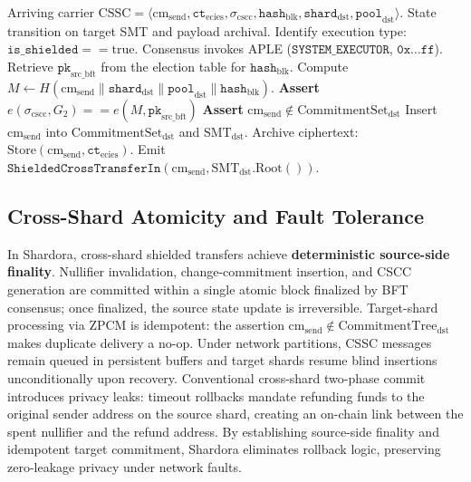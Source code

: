 \documentclass[sigconf,nonacm]{acmart}
\begin{document}
\begin{algorithm}[h]
\caption{Target Shard ZPCM Autonomous Execution (APLE)}
\label{alg:target_zpcm}
\begin{algorithmic}[1]
\Require Arriving carrier $\text{CSSC} = \langle \text{cm}_{\text{send}}, \mathtt{ct}_{\text{ecies}}, \sigma_{\text{cscc}}, \mathtt{hash}_{\text{blk}}, \mathtt{shard}_{\text{dst}}, \mathtt{pool}_{\text{dst}} \rangle$.
\Ensure State transition on target SMT and payload archival.
\State Identify execution type: $\mathtt{is\_shielded} == \text{true}$.
\State Consensus invokes APLE ($\mathtt{SYSTEM\_EXECUTOR}$, $\mathtt{0x\ldots ff}$).
\State Retrieve $\mathtt{pk}_{\text{src\_bft}}$ from the election table for $\mathtt{hash}_{\text{blk}}$.
\State Compute $M \leftarrow H(\text{cm}_{\text{send}} \parallel \mathtt{shard}_{\text{dst}} \parallel \mathtt{pool}_{\text{dst}} \parallel \mathtt{hash}_{\text{blk}})$.
\State \textbf{Assert} $e(\sigma_{\text{cscc}}, G_2) == e(M, \mathtt{pk}_{\text{src\_bft}})$ 
\State \textbf{Assert} $\text{cm}_{\text{send}} \notin \text{CommitmentSet}_{\text{dst}}$ 
\State Insert $\text{cm}_{\text{send}}$ into $\text{CommitmentSet}_{\text{dst}}$ and $\text{SMT}_{\text{dst}}$.
\State Archive ciphertext: $\text{Store}(\text{cm}_{\text{send}}, \mathtt{ct}_{\text{ecies}})$.
\State Emit $\mathtt{ShieldedCrossTransferIn}(\text{cm}_{\text{send}}, \text{SMT}_{\text{dst}}.\text{Root}())$.
\end{algorithmic}
\end{algorithm}

\subsection{Cross-Shard Atomicity and Fault Tolerance}
In Shardora, cross-shard shielded transfers achieve \textbf{deterministic source-side finality}. Nullifier invalidation, change-commitment insertion, and CSCC generation are committed within a single atomic block finalized by BFT consensus; once finalized, the source state update is irreversible. Target-shard processing via ZPCM is idempotent: the assertion $\text{cm}_{\text{send}} \notin \text{CommitmentTree}_{\text{dst}}$ makes duplicate delivery a no-op. Under network partitions, CSSC messages remain queued in persistent buffers and target shards resume blind insertions unconditionally upon recovery. Conventional cross-shard two-phase commit introduces privacy leaks: timeout rollbacks mandate refunding funds to the original sender address on the source shard, creating an on-chain link between the spent nullifier and the refund address. By establishing source-side finality and idempotent target commitment, Shardora eliminates rollback logic, preserving zero-leakage privacy under network faults.
\end{document}
